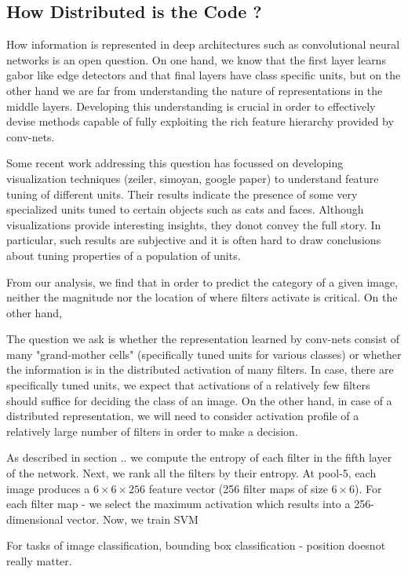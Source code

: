 \documentclass[runningheads]{llncs}
\begin{document}
\subsection{How Distributed is the Code ?}
How information is represented in deep architectures such as convolutional neural networks is an open question. On one hand, we know that the first layer learns gabor like edge detectors and that final layers have class specific units, but on the other hand we are far from understanding the nature of representations in the middle layers. Developing this understanding is crucial in order to effectively devise methods capable of fully exploiting the rich feature hierarchy provided by conv-nets.

Some recent work addressing this question has focussed on developing visualization techniques (zeiler, simoyan, google paper) to understand feature tuning of different units. Their results indicate the presence of some very specialized units tuned to certain objects such as cats and faces. Although visualizations provide interesting insights, they donot convey the full story. In particular, such results are subjective and it is often hard to draw conclusions about tuning properties of a population of units. 

From our analysis, we find that in order to predict the category of a given image, neither the magnitude nor the location of where filters activate is critical. On the other hand, 

The question we ask is whether the representation learned by conv-nets consist of many "grand-mother cells" (specifically tuned units for various classes) or whether the information is in the distributed activation of many filters. In case, there are specifically tuned units, we expect that activations of a relatively few filters should suffice for deciding the class of an image. On the other hand, in case of a distributed representation, we will need to consider activation profile of a relatively large number of filters in order to make a decision. 

As described in section .. we compute the entropy of each filter in the fifth layer of the network. Next, we rank all the filters by their entropy. At pool-5, each image produces a $6 \times 6 \times 256 $ feature vector (256 filter maps of size $6 \times 6$). For each filter map - we select the maximum activation which results into a 256-dimensional vector. Now, we train SVM 
 
For tasks of image classification, bounding box classification - position doesnot really matter. 
\end{document}

